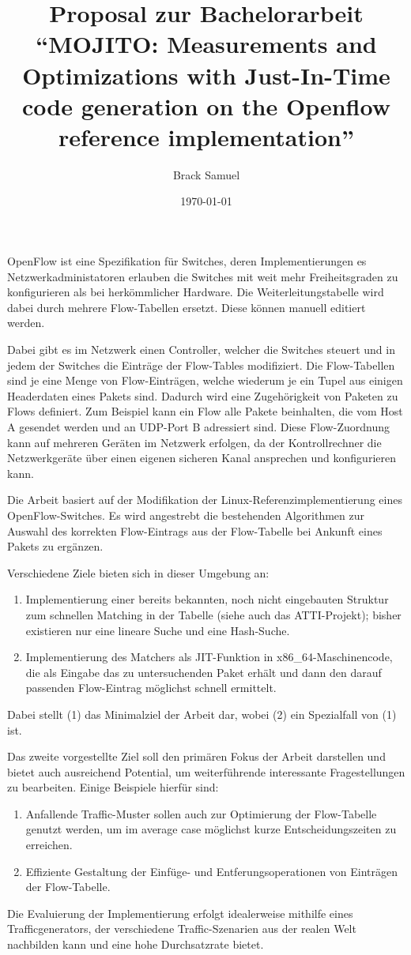 \documentclass[a4paper,
		12pt,
		oneside,ngerman
		]{scrartcl}
\title{Proposal zur Bachelorarbeit ``MOJITO: Measurements and Optimizations with Just-In-Time code generation on the Openflow reference implementation''}
\author{Brack Samuel}
\date{\today}
\begin{document}
\maketitle
OpenFlow ist eine Spezifikation für Switches, deren Implementierungen es Netzwerkadministatoren erlauben die Switches mit weit mehr Freiheitsgraden zu konfigurieren als bei herkömmlicher Hardware.
Die Weiterleitungstabelle wird dabei durch mehrere Flow-Tabellen ersetzt.
Diese können manuell editiert werden.

Dabei gibt es im Netzwerk einen Controller, welcher die Switches steuert und in jedem der Switches die Einträge der Flow-Tables modifiziert.
Die Flow-Tabellen sind je eine Menge von Flow-Einträgen, welche wiederum je ein Tupel aus einigen Headerdaten eines Pakets sind. 
Dadurch wird eine Zugehörigkeit von Paketen zu Flows definiert.
Zum Beispiel kann ein Flow alle Pakete beinhalten, die vom Host A gesendet werden und an UDP-Port B adressiert sind.
Diese Flow-Zuordnung kann auf mehreren Geräten im Netzwerk erfolgen, da der Kontrollrechner die Netzwerkgeräte über einen eigenen sicheren Kanal ansprechen und konfigurieren kann.

Die Arbeit basiert auf der Modifikation der Linux-Referenzimplementierung eines OpenFlow-Switches.
Es wird angestrebt die bestehenden Algorithmen zur Auswahl des korrekten Flow-Eintrags aus der Flow-Tabelle bei Ankunft eines Pakets zu ergänzen.

Verschiedene Ziele bieten sich in dieser Umgebung an:
\begin{enumerate}
    \item Implementierung einer bereits bekannten, noch nicht eingebauten Struktur zum schnellen Matching in der Tabelle (siehe auch das ATTI-Projekt); bisher existieren nur eine lineare Suche und eine Hash-Suche.
    \item Implementierung des Matchers als JIT-Funktion in x86\_64-Maschinencode, die als Eingabe das zu untersuchenden Paket erhält und dann den darauf passenden Flow-Eintrag möglichst schnell ermittelt.
\end{enumerate}

Dabei stellt (1) das Minimalziel der Arbeit dar, wobei (2) ein Spezialfall von (1) ist.

Das zweite vorgestellte Ziel soll den primären Fokus der Arbeit darstellen und bietet auch ausreichend Potential, um weiterführende interessante Fragestellungen zu bearbeiten.
Einige Beispiele hierfür sind:
\begin{enumerate}
    \item Anfallende Traffic-Muster sollen auch zur Optimierung der Flow-Tabelle genutzt werden, um im average case möglichst kurze Entscheidungszeiten zu erreichen.
    \item Effiziente Gestaltung der Einfüge- und Entferungsoperationen von Einträgen der Flow-Tabelle.
\end{enumerate}

Die Evaluierung der Implementierung erfolgt idealerweise mithilfe eines Trafficgenerators, der verschiedene Traffic-Szenarien aus der realen Welt nachbilden kann und eine hohe Durchsatzrate bietet.
\end{document}
